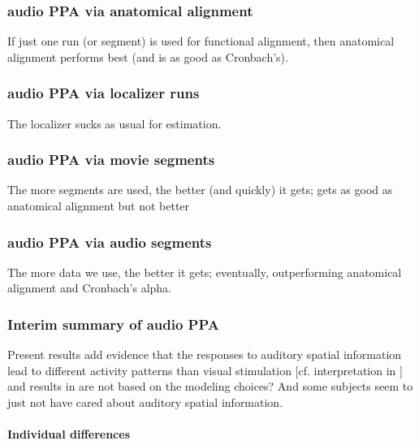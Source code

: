 \subsubsection{audio PPA via anatomical alignment}


If just one run (or segment) is used for functional alignment, then anatomical
alignment performs best (and is as good as Cronbach's).


\subsubsection{audio PPA via localizer runs}

The localizer sucks as usual for estimation.


\subsubsection{audio PPA via movie segments}

The more segments are used, the better (and quickly) it gets; gets as good as
anatomical alignment but not better


\subsubsection{audio PPA via audio segments}

The more data we use, the better it gets; eventually, outperforming anatomical
alignment and Cronbach's alpha.


\subsubsection{Interim summary of audio PPA}


%
Present results add evidence that the responses to auditory spatial information
lead to different activity patterns than visual stimulation [cf. interpretation
in \citet{haeusler2022processing}] and results in \citet{haeusler2022processing}
are not based on the modeling choices?
%
And some subjects seem to just not have cared about auditory spatial
information.



\paragraph{Individual differences}

